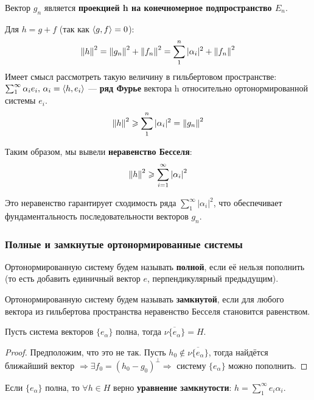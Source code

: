 \documentclass[12pt]{article}
\begin{document}
			Вектор $g_n$ является \textbf{проекцией h на конечномерное подпространство $E_n$}.

			Для $h = g + f$ (так как $\left\langle g, f \right\rangle = 0$):
			$$ \left\| h \right\|^2 = \left\| g_n \right\|^2 + \left\| f_n \right\|^2 = \sum_1^n |\alpha_i|^2 + \left\| f_n \right\|^2$$
			Имеет смысл рассмотреть такую величину в гильбертовом пространстве: 
			$\sum_1^{\infty} \alpha_i e_i,\, \alpha_i = \left\langle h, e_i \right\rangle$ --- \textbf{ряд Фурье} вектора h относительно ортонормированной системы $e_i$.
			$$ \left\| h \right\|^2 \geqslant \sum_1^n |\alpha_i|^2 = \left\| g_n \right\|^2 $$
	
			Таким образом, мы вывели \textbf{неравенство Бесселя}:
			$$ \left\| h \right\|^2 \geqslant \sum_{i=1}^{\infty} \left| \alpha_i \right|^2 $$

			Это неравенство гарантирует сходимость ряда $\sum_1^{\infty} |\alpha_i|^2$, что обеспечивает
			фундаментальность последовательности векторов $g_n$.

		\subsubsection{Полные и замкнутые ортонормированные системы}

			\begin{defi}
				Ортонормированную систему будем называть \textbf{полной}, если её нельзя пополнить 
				(то есть добавить единичный вектор $e$, перпендикулярный предыдущим).
			\end{defi}

			\begin{defi}
				Ортонормированную систему будем называть \textbf{замкнутой}, если для любого вектора из 
				гильбертова пространства неравенство Бесселя становится равенством.
			\end{defi}

			\begin{state}
				Пусть система векторов $\{ e_\alpha \}$ полна, тогда $\overline{ \nu \{ e_\alpha \} } = H$.
			\end{state}
			\begin{proof}
				Предположим, что это не так. Пусть $h_0 \notin \overline{ \nu \{ e_\alpha \} }$, тогда найдётся ближайший вектор $\Rightarrow
				\exists f_0 	= (h_0 - g_0)^\perp	\Rightarrow$ систему $\{ e_{\alpha} \}$ можно пополнить.
			\end{proof}

			\begin{state}
				\label{st:equality}
				Если $\{ e_\alpha \}$ полна, то $\forall h \in H$ верно \textbf{уравнение замкнутости}: $h = \sum_1^{\infty} e_i \alpha_i$.
			\end{state}
\end{document}
